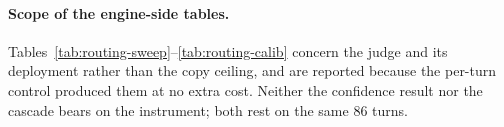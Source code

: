 \paragraph{Scope of the engine-side tables.} Tables~\ref{tab:routing-sweep}--\ref{tab:routing-calib} concern the judge and its deployment rather than the copy ceiling, and are reported because the per-turn control produced them at no extra cost. Neither the confidence result nor the cascade bears on the instrument; both rest on the same 86 turns.

